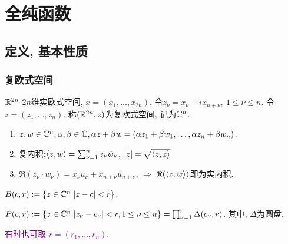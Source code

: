 \chapter{全纯函数}
\section{定义, 基本性质}

\subsection{复欧式空间}


\begin{definition}[复欧式空间]
  ${\mathbb R}^{2n}$-$2n$维实欧式空间, $x=(x_1,\dots,x_{2n})$. 令$z_\nu=x_\nu +i x_{n+\nu },~ 1\leq \nu \leq n.$   令$z=(z_1,...,z_n).$ 称$({\mathbb R}^{2n},z) $为复欧式空间, 记为${\mathbb C}^n$.
\end{definition}
\begin{enumerate}
  \item $z,w \in {\mathbb C}^n, \alpha ,\beta \in {\mathbb C}, \alpha z +\beta w =(\alpha z_1 +\beta w_1,\dots, \alpha z_n +\beta w_n)$.
  \item 复内积:$\langle z, w\rangle=\sum_{\nu =1}^{n}z_\nu \bar w_\nu  $, $|z|=\sqrt{\langle z, z\rangle }$
  \item $\Re (z_\nu \cdot \bar{w}_\nu )= x_\nu u_\nu +x_{n+\nu }u_{n+\nu }$, $\Rightarrow  $ $\Re (\langle z, w\rangle ) $即为实内积.
\end{enumerate}

\begin{definition}[超球]
  $B(c,r):=\{z\in {\mathbb C}^n| |z-c|<r\}$.
\end{definition}
\begin{definition}[多圆柱]
  $P(c,r):=\{z \in {\mathbb C}^n| |z_\nu -c_\nu| <r, 1 \leq \nu \leq n \}=\prod_{\nu =1}^{n} \Delta (c_\nu ,r)$. 其中, $\Delta $为圆盘.
\end{definition}
\begin{remark}
  \textcolor{purple}{有时也可取 $r=(r_1,\dots,r_n)$.} 
\end{remark}

